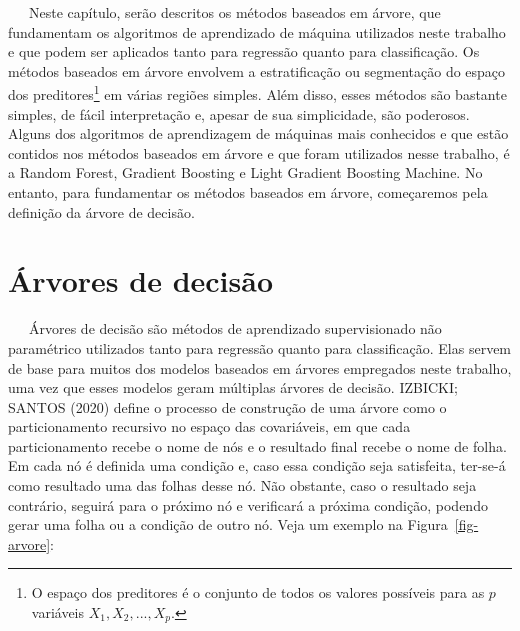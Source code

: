 \documentclass[
  12pt,
  letterpaper,
  DIV=11,
  numbers=noendperiod]{scrreprt}
\begin{document}
~~~Neste capítulo, serão descritos os métodos baseados em árvore, que
fundamentam os algoritmos de aprendizado de máquina utilizados neste
trabalho e que podem ser aplicados tanto para regressão quanto para
classificação. Os métodos baseados em árvore envolvem a estratificação
ou segmentação do espaço dos preditores\footnote{O espaço dos preditores
  é o conjunto de todos os valores possíveis para as \(p\) variáveis
  \(X_1, X_2, ..., X_p\).} em várias regiões simples. Além disso, esses
métodos são bastante simples, de fácil interpretação e, apesar de sua
simplicidade, são poderosos. Alguns dos algoritmos de aprendizagem de
máquinas mais conhecidos e que estão contidos nos métodos baseados em
árvore e que foram utilizados nesse trabalho, é a Random Forest,
Gradient Boosting e Light Gradient Boosting Machine. No entanto, para
fundamentar os métodos baseados em árvore, começaremos pela definição da
árvore de decisão.

\section{Árvores de decisão}\label{uxe1rvores-de-decisuxe3o}

~~~Árvores de decisão são métodos de aprendizado supervisionado não
paramétrico utilizados tanto para regressão quanto para classificação.
Elas servem de base para muitos dos modelos baseados em árvores
empregados neste trabalho, uma vez que esses modelos geram múltiplas
árvores de decisão. IZBICKI; SANTOS (2020) define o processo de
construção de uma árvore como o particionamento recursivo no espaço das
covariáveis, em que cada particionamento recebe o nome de nós e o
resultado final recebe o nome de folha. Em cada nó é definida uma
condição e, caso essa condição seja satisfeita, ter-se-á como resultado
uma das folhas desse nó. Não obstante, caso o resultado seja contrário,
seguirá para o próximo nó e verificará a próxima condição, podendo gerar
uma folha ou a condição de outro nó. Veja um exemplo na
Figura~\ref{fig-arvore}:
\end{document}
